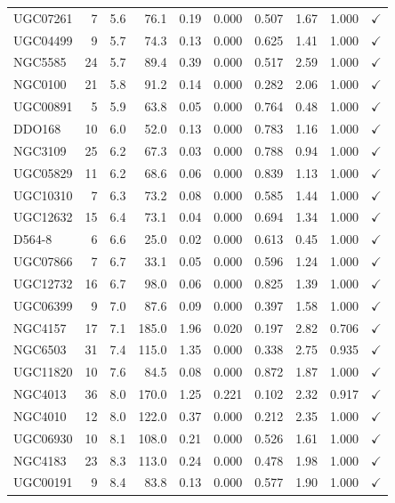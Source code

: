 \begin{longtable}{lrrrrrrrrr}
UGC07261 & 7 & 5.6 & 76.1 & 0.19 & 0.000 & 0.507 & 1.67 & 1.000 & $\checkmark$ \\
UGC04499 & 9 & 5.7 & 74.3 & 0.13 & 0.000 & 0.625 & 1.41 & 1.000 & $\checkmark$ \\
NGC5585 & 24 & 5.7 & 89.4 & 0.39 & 0.000 & 0.517 & 2.59 & 1.000 & $\checkmark$ \\
NGC0100 & 21 & 5.8 & 91.2 & 0.14 & 0.000 & 0.282 & 2.06 & 1.000 & $\checkmark$ \\
UGC00891 & 5 & 5.9 & 63.8 & 0.05 & 0.000 & 0.764 & 0.48 & 1.000 & $\checkmark$ \\
DDO168 & 10 & 6.0 & 52.0 & 0.13 & 0.000 & 0.783 & 1.16 & 1.000 & $\checkmark$ \\
NGC3109 & 25 & 6.2 & 67.3 & 0.03 & 0.000 & 0.788 & 0.94 & 1.000 & $\checkmark$ \\
UGC05829 & 11 & 6.2 & 68.6 & 0.06 & 0.000 & 0.839 & 1.13 & 1.000 & $\checkmark$ \\
UGC10310 & 7 & 6.3 & 73.2 & 0.08 & 0.000 & 0.585 & 1.44 & 1.000 & $\checkmark$ \\
UGC12632 & 15 & 6.4 & 73.1 & 0.04 & 0.000 & 0.694 & 1.34 & 1.000 & $\checkmark$ \\
D564-8 & 6 & 6.6 & 25.0 & 0.02 & 0.000 & 0.613 & 0.45 & 1.000 & $\checkmark$ \\
UGC07866 & 7 & 6.7 & 33.1 & 0.05 & 0.000 & 0.596 & 1.24 & 1.000 & $\checkmark$ \\
UGC12732 & 16 & 6.7 & 98.0 & 0.06 & 0.000 & 0.825 & 1.39 & 1.000 & $\checkmark$ \\
UGC06399 & 9 & 7.0 & 87.6 & 0.09 & 0.000 & 0.397 & 1.58 & 1.000 & $\checkmark$ \\
NGC4157 & 17 & 7.1 & 185.0 & 1.96 & 0.020 & 0.197 & 2.82 & 0.706 & $\checkmark$ \\
NGC6503 & 31 & 7.4 & 115.0 & 1.35 & 0.000 & 0.338 & 2.75 & 0.935 & $\checkmark$ \\
UGC11820 & 10 & 7.6 & 84.5 & 0.08 & 0.000 & 0.872 & 1.87 & 1.000 & $\checkmark$ \\
NGC4013 & 36 & 8.0 & 170.0 & 1.25 & 0.221 & 0.102 & 2.32 & 0.917 & $\checkmark$ \\
NGC4010 & 12 & 8.0 & 122.0 & 0.37 & 0.000 & 0.212 & 2.35 & 1.000 & $\checkmark$ \\
UGC06930 & 10 & 8.1 & 108.0 & 0.21 & 0.000 & 0.526 & 1.61 & 1.000 & $\checkmark$ \\
NGC4183 & 23 & 8.3 & 113.0 & 0.24 & 0.000 & 0.478 & 1.98 & 1.000 & $\checkmark$ \\
UGC00191 & 9 & 8.4 & 83.8 & 0.13 & 0.000 & 0.577 & 1.90 & 1.000 & $\checkmark$ \\

\end{longtable}
